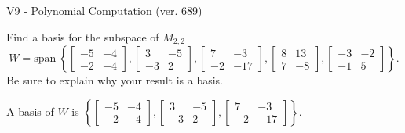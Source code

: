 \begin{exercise}
  \begin{exerciseTitle}V9 - Polynomial Computation (ver. 689)\end{exerciseTitle}
  \begin{exerciseStatement}
    Find a basis for the subspace of \(M_{2,2}\) 
\[W=\mathrm{span}\ \left\{\left[\begin{array}{cc}
-5 & -4 \\
-2 & -4
\end{array}\right] , \left[\begin{array}{cc}
3 & -5 \\
-3 & 2
\end{array}\right] , \left[\begin{array}{cc}
7 & -3 \\
-2 & -17
\end{array}\right] , \left[\begin{array}{cc}
8 & 13 \\
7 & -8
\end{array}\right] , \left[\begin{array}{cc}
-3 & -2 \\
-1 & 5
\end{array}\right]\right\}.\]
 Be sure to explain why your result is a basis.


  \end{exerciseStatement}
  \begin{exerciseAnswer}
   A basis of \(W\) is  \(\left\{\left[\begin{array}{cc}
-5 & -4 \\
-2 & -4
\end{array}\right] , \left[\begin{array}{cc}
3 & -5 \\
-3 & 2
\end{array}\right] , \left[\begin{array}{cc}
7 & -3 \\
-2 & -17
\end{array}\right]\right\}\).
  


  \end{exerciseAnswer}
\end{exercise}